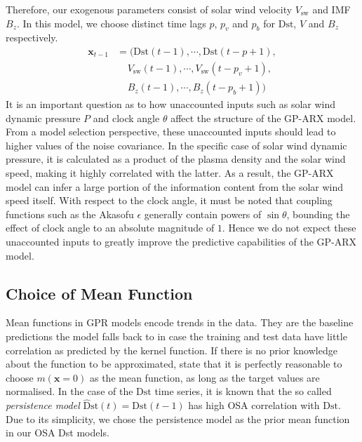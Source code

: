 Therefore, our exogenous parameters consist of solar wind velocity $ V_{\text{sw}}$ and IMF $B_z$. 
In this model, we choose distinct time lags $p$, $p_{v}$ and $p_{b}$ for $\mathrm{Dst}$, $V$ and 
$B_z$ respectively.
%
\begin{align*}
       \mathbf{x}_{t-1} & = (\mathrm{Dst}(t-1), \cdots , \mathrm{Dst}(t-p+1), \\
        & \ \ \ \ \  V_{\text{sw}}(t-1), \cdots, V_{\text{sw}}(t-p_{v}+1),\\
        & \ \ \ \ \  B_{z}(t-1), \cdots, B_{z}(t-p_{b}+1))
\end{align*}
%
It is an important question as to how unaccounted inputs such as solar wind dynamic pressure $P$ 
and clock angle $\theta$ affect the structure of the GP-ARX model. From a model selection 
perspective, these unaccounted inputs should lead to higher values of the noise covariance. In the 
specific case of solar wind dynamic pressure, it is calculated as a product of the plasma density 
and the solar wind speed, making it highly correlated with the latter. As a result, the GP-ARX model 
can infer a large portion of the information content from the solar wind speed itself. 
With respect to the clock angle, it must be noted that coupling functions such as the Akasofu 
$\epsilon$ generally contain powers of $\sin \theta$, bounding the effect of clock angle to an 
absolute magnitude of $1$. Hence we do not expect these unaccounted inputs to greatly improve the 
predictive capabilities of the GP-ARX model.

\subsection{Choice of Mean Function}

Mean functions in GPR models encode trends in the data. They are the baseline predictions the model 
falls back to in case the training and test data have little correlation as predicted by the kernel 
function. If there is no prior knowledge about the function to be approximated, 
\citet{Rasmussen:2005:GPM:1162254} state that it is perfectly reasonable to choose 
$m(\mathbf{x} = 0)$ as the mean function, as long as the target values are normalised. In the case 
of the $\mathrm{Dst}$ time series, it is known that the so called \emph{persistence model} 
$\mathrm{\hat{D}st}(t) = \mathrm{Dst}(t-1)$ has high OSA correlation with $\mathrm{Dst}$. 
Due to its simplicity, we chose the persistence model as the prior mean function in our 
OSA Dst models. 

